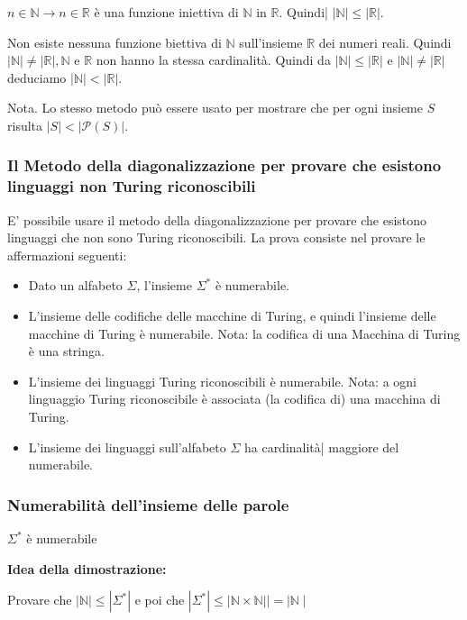 $n \in \mathbb{N} \rightarrow n \in \mathbb{R}$ è una funzione iniettiva di $\mathbb{N}$ in $\mathbb{R}$. Quindi| $|\mathbb{N}| \leq|\mathbb{R}| .$


Non esiste nessuna funzione biettiva di $\mathbb{N}$ sull'insieme $\mathbb{R}$ dei numeri reali. Quindi $|\mathbb{N}| \neq|\mathbb{R}|, \mathbb{N}$ e $\mathbb{R}$ non hanno la stessa cardinalità. Quindi da $|\mathbb{N}| \leq|\mathbb{R}|$ e $|\mathbb{N}| \neq|\mathbb{R}|$ deduciamo $|\mathbb{N}|<|\mathbb{R}|$.


Nota. Lo stesso metodo può essere usato per mostrare che per ogni insieme $S$ risulta $|S|<|\mathcal{P}(S)|$.

\subsubsection{Il Metodo della diagonalizzazione per provare che esistono
linguaggi non Turing riconoscibili}

E' possibile usare il metodo della diagonalizzazione per provare che esistono linguaggi che non sono Turing riconoscibili.
La prova consiste nel provare le affermazioni seguenti:
\begin{itemize}
    \item Dato un alfabeto $\Sigma$, l'insieme $\Sigma^{*}$ è numerabile.
    \item L'insieme delle codifiche delle macchine di Turing, e quindi l'insieme delle macchine di Turing è numerabile.
Nota: la codifica di una Macchina di Turing è una stringa.
    \item L'insieme dei linguaggi Turing riconoscibili è numerabile. Nota: a ogni linguaggio Turing riconoscibile è associata (la codifica di) una macchina di Turing.
    \item L'insieme dei linguaggi sull'alfabeto $\Sigma$ ha cardinalità| maggiore del numerabile.
\end{itemize}

\subsubsection{Numerabilità dell'insieme delle parole}

$\Sigma^{*}$ è numerabile

\vspace{5mm}

\textbf{Idea della dimostrazione:}

Provare che $|\mathbb{N}| \leq\left|\Sigma^{*}\right|$ e poi che $\left|\Sigma^{*}\right| \leq|\mathbb{N} \times \mathbb{N}||=| \mathbb{N} \mid$

